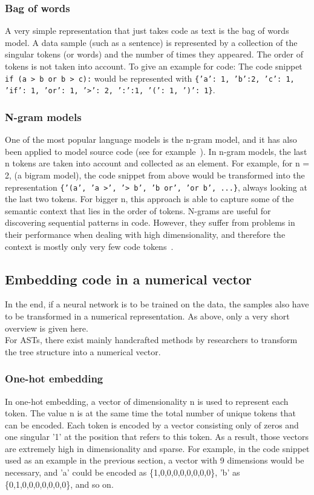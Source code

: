 \documentclass[
a4paper,
pagesize,
pdftex,
12pt,
ngerman,
fleqn,
final,
]{scrartcl}
\begin{document}
	\subsubsection{Bag of words}\label{bag-of-words}
	A very simple representation that just takes code as text is the bag of words model. A data sample (such as a sentence) is represented by a collection of the singular tokens (or words) and the number of times they appeared. The order of tokens is not taken into account. To give an example for code: The code snippet \texttt{if (a > b or b > c):} would be represented with \texttt{\{'a': 1, 'b':2, 'c': 1, 'if': 1, 'or': 1, '>': 2, ':':1, '(': 1, ')': 1\}}.
	
	\subsubsection{N-gram models}\label{n-gram}
	One of the most popular language models is the n-gram model, and it has also been applied to model source code (see for example~\cite{Pang.2015}). In n-gram models, the last n tokens are taken into account and collected as an element. For example, for n = 2, (a bigram model), the code snippet from above would be transformed into the representation \texttt{\{'(a', 'a >', '> b', 'b or', 'or b', ...\}}, always looking at the last two tokens. For bigger n, this approach is able to capture some of the semantic context that lies in the order of tokens. N-grams are useful for discovering sequential patterns in code. However, they suffer from problems in their performance when dealing with high dimensionality, and therefore the context is mostly only very few code tokens~\cite{Dam.2016}.
	
	
	\subsection{Embedding code in a numerical vector}
	In the end, if a neural network is to be trained on the data, the samples also have to be transformed in a numerical representation. As above, only a very short overview is given here.\\
	For ASTs, there exist mainly handcrafted methods by researchers to transform the tree structure into a numerical vector.
	
	\subsubsection{One-hot embedding}\label{one-hot}
	In one-hot embedding, a vector of dimensionality n is used to represent each token. The value n is at the same time the total number of unique tokens that can be encoded. Each token is encoded by a vector consisting only of zeros and one singular '1' at the position that refers to this token. As a result, those vectors are extremely high in dimensionality and sparse. For example, in the code snippet used as an example in the previous section, a vector with 9 dimensions would be necessary, and 'a' could be encoded as \{1,0,0,0,0,0,0,0,0\}, 'b' as \{0,1,0,0,0,0,0,0,0\}, and so on.
	
\end{document}
